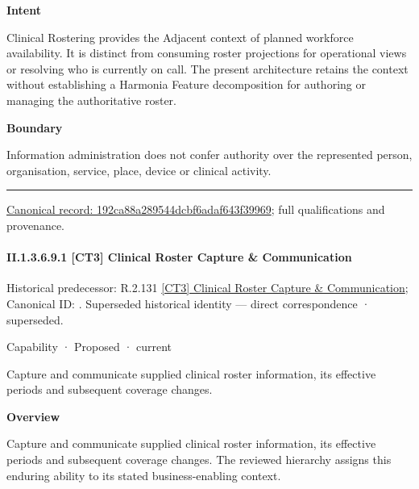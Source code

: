 \textbf{Intent}



Clinical Rostering provides the Adjacent context of planned workforce availability. It is distinct from consuming roster projections for operational views or resolving who is currently on call. The present architecture retains the context without establishing a Harmonia Feature decomposition for authoring or managing the authoritative roster.



\textbf{Boundary}



Information administration does not confer authority over the represented person, organisation, service, place, device or clinical activity.



\medskip\hrule\medskip

{\footnotesize \href{../../../../continuum/strategy/capability/192ca88a289544dcbf6adaf643f39969.md}{Canonical record: 192ca88a289544dcbf6adaf643f39969}; full qualifications and provenance.}\par
\paragraph*{II.1.3.6.9.1 [CT3] Clinical Roster Capture \& Communication}
\label{navigation:II.1.3.6.9.1}

{\small Historical predecessor: R.2.131 \hyperref[element:2054d57bb33a4361b3ef0824545a1784]{[CT3] Clinical Roster Capture \& Communication}; Canonical ID: \texttt{}. Superseded historical identity — direct correspondence · superseded.}\par
\label{element:8243cba81fb6449781d10823ae194237}
{\small Capability · Proposed · current}\par

Capture and communicate supplied clinical roster information, its effective periods and subsequent coverage changes.



\textbf{Overview}



Capture and communicate supplied clinical roster information, its effective periods and subsequent coverage changes. The reviewed hierarchy assigns this enduring ability to its stated business-enabling context.



